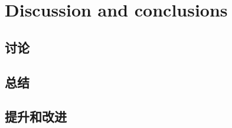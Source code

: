\section{Discussion and conclusions}
\label{sec:results}

\subsection{讨论}

\subsection{总结}


\subsection{提升和改进}








\FloatBarrier %